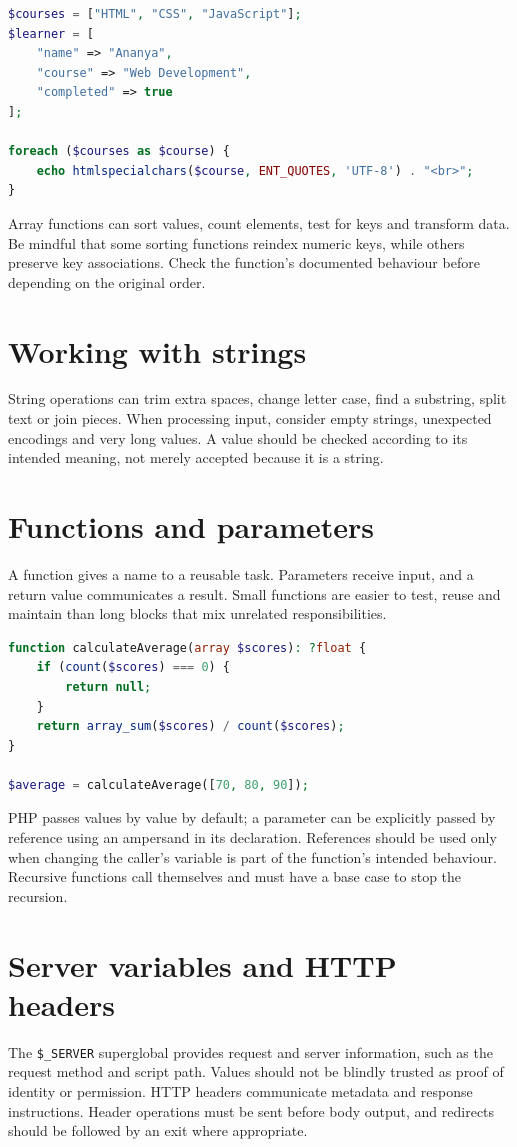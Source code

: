 \documentclass[11pt,openany,oneside]{book}
\begin{document}
\begin{lstlisting}[style=webcode,language=PHP]
$courses = ["HTML", "CSS", "JavaScript"];
$learner = [
    "name" => "Ananya",
    "course" => "Web Development",
    "completed" => true
];

foreach ($courses as $course) {
    echo htmlspecialchars($course, ENT_QUOTES, 'UTF-8') . "<br>";
}
\end{lstlisting}
Array functions can sort values, count elements, test for keys and transform data. Be mindful that some sorting functions reindex numeric keys, while others preserve key associations. Check the function's documented behaviour before depending on the original order.

\section{Working with strings}
String operations can trim extra spaces, change letter case, find a substring, split text or join pieces. When processing input, consider empty strings, unexpected encodings and very long values. A value should be checked according to its intended meaning, not merely accepted because it is a string.

\section{Functions and parameters}
A function gives a name to a reusable task. Parameters receive input, and a return value communicates a result. Small functions are easier to test, reuse and maintain than long blocks that mix unrelated responsibilities.

\begin{lstlisting}[style=webcode,language=PHP]
function calculateAverage(array $scores): ?float {
    if (count($scores) === 0) {
        return null;
    }
    return array_sum($scores) / count($scores);
}

$average = calculateAverage([70, 80, 90]);
\end{lstlisting}
PHP passes values by value by default; a parameter can be explicitly passed by reference using an ampersand in its declaration. References should be used only when changing the caller's variable is part of the function's intended behaviour. Recursive functions call themselves and must have a base case to stop the recursion.

\section{Server variables and HTTP headers}
The \texttt{\$\_SERVER} superglobal provides request and server information, such as the request method and script path. Values should not be blindly trusted as proof of identity or permission. HTTP headers communicate metadata and response instructions. Header operations must be sent before body output, and redirects should be followed by an exit where appropriate.
\end{document}
